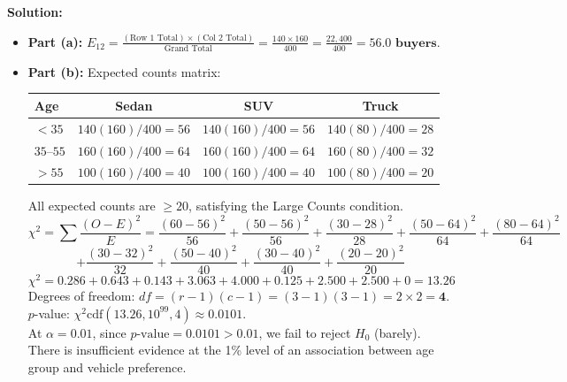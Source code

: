 \textbf{Solution:}
\begin{itemize}[leftmargin=1.2em]
  \item \textbf{Part (a):} $E_{12} = \frac{(\text{Row 1 Total}) \times (\text{Col 2 Total})}{\text{Grand Total}} = \frac{140 \times 160}{400} = \frac{22,400}{400} = \mathbf{56.0\text{ buyers}}$.
  \item \textbf{Part (b):}
  Expected counts matrix:
  \begin{center}
  \begin{tabular}{lccc}
  \toprule
  \textbf{Age} & \textbf{Sedan} & \textbf{SUV} & \textbf{Truck} \\
  \midrule
  $< 35$ & $140(160)/400 = 56$ & $140(160)/400 = 56$ & $140(80)/400 = 28$ \\
  $35\text{--}55$ & $160(160)/400 = 64$ & $160(160)/400 = 64$ & $160(80)/400 = 32$ \\
  $> 55$ & $100(160)/400 = 40$ & $100(160)/400 = 40$ & $100(80)/400 = 20$ \\
  \bottomrule
  \end{tabular}
  \end{center}
  All expected counts are $\ge 20$, satisfying the Large Counts condition.\\
  \[ \chi^2 = \sum \frac{(O - E)^2}{E} = \frac{(60-56)^2}{56} + \frac{(50-56)^2}{56} + \frac{(30-28)^2}{28} + \frac{(50-64)^2}{64} + \frac{(80-64)^2}{64} \]
  \[ + \frac{(30-32)^2}{32} + \frac{(50-40)^2}{40} + \frac{(30-40)^2}{40} + \frac{(20-20)^2}{20} \]
  \[ \chi^2 = 0.286 + 0.643 + 0.143 + 3.063 + 4.000 + 0.125 + 2.500 + 2.500 + 0 = \mathbf{13.26} \]
  Degrees of freedom: $df = (r - 1)(c - 1) = (3 - 1)(3 - 1) = 2 \times 2 = \mathbf{4}$.\\
  $p$-value: $\chi^2\text{cdf}(13.26, 10^{99}, 4) \approx \mathbf{0.0101}$.\\
  At $\alpha = 0.01$, since $p\text{-value} = 0.0101 > 0.01$, we fail to reject $H_0$ (barely). There is insufficient evidence at the 1\% level of an association between age group and vehicle preference.
\end{itemize}

